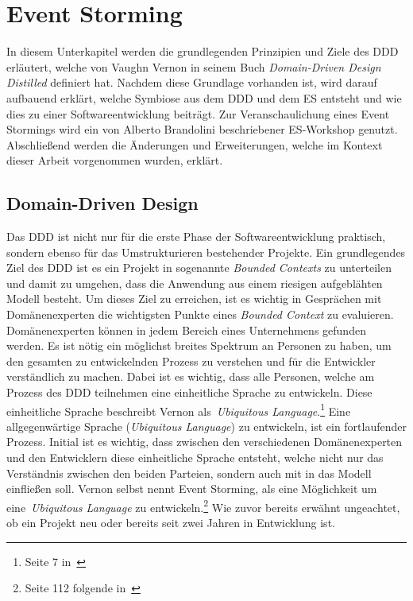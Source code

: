 \section{Event Storming}\label{sec:event-storming}
In diesem Unterkapitel werden die grundlegenden Prinzipien und Ziele des \ac{DDD} erläutert, welche von Vaughn Vernon in seinem Buch
\textit{Domain-Driven Design Distilled} definiert hat.\cite*{dddd}
Nachdem diese Grundlage vorhanden ist, wird darauf aufbauend erklärt, welche Symbiose aus dem \ac{DDD} und dem \ac{ES} entsteht und wie
dies zu einer Softwareentwicklung beiträgt.
Zur Veranschaulichung eines Event Stormings wird ein von Alberto Brandolini beschriebener \ac{ES}-Workshop genutzt.
Abschließend werden die Änderungen und Erweiterungen, welche im Kontext dieser Arbeit vorgenommen wurden, erklärt.

\subsection{Domain-Driven Design}\label{subsec:domain-driven-design}
Das \ac*{DDD} ist nicht nur für die erste Phase der Softwareentwicklung praktisch, sondern ebenso für das Umstrukturieren bestehender Projekte.
Ein grundlegendes Ziel des \ac{DDD} ist es ein Projekt in sogenannte \textit{Bounded Contexts} zu unterteilen und damit zu umgehen, dass
die Anwendung aus einem riesigen aufgeblähten Modell besteht.
Um dieses Ziel zu erreichen, ist es wichtig in Gesprächen mit Domänenexperten die wichtigsten Punkte eines \textit{Bounded Context} zu evaluieren.
Domänenexperten können in jedem Bereich eines Unternehmens gefunden werden.
Es ist nötig ein möglichst breites Spektrum an Personen zu haben, um den gesamten zu entwickelnden Prozess zu verstehen und für die Entwickler verständlich zu machen.
Dabei ist es wichtig, dass alle Personen, welche am Prozess des \ac{DDD} teilnehmen eine einheitliche Sprache zu entwickeln.
Diese einheitliche Sprache beschreibt Vernon als~\textit{Ubiquitous Language}.\footnote{Seite 7 in~\cite*{dddd}}
Eine allgegenwärtige Sprache (\textit{Ubiquitous Language}) zu entwickeln, ist ein fortlaufender Prozess.
Initial ist es wichtig, dass zwischen den verschiedenen Domänenexperten und den Entwicklern diese einheitliche Sprache entsteht, welche
nicht nur das Verständnis zwischen den beiden Parteien, sondern auch mit in das Modell einfließen soll.
Vernon selbst nennt Event Storming, als eine Möglichkeit um eine~\textit{Ubiquitous Language} zu entwickeln.\footnote{Seite 112 folgende in~\cite*{dddd}}
Wie zuvor bereits erwähnt ungeachtet, ob ein Projekt neu oder bereits seit zwei Jahren in Entwicklung ist.

